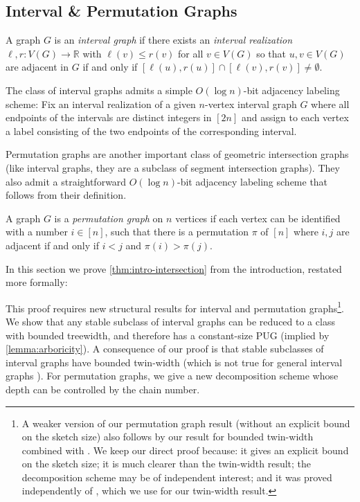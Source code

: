 \documentclass{theoretics}
\makeatletter
\newcommand{\cF}{\ensuremath{\mathcal{F}}}
\newcommand{\bR}{\ensuremath{\mathbb{R}}}
\newcommand\IfRestateTF{%
  \ifx\label\thmt@gobble@label %
    \expandafter\@firstoftwo
  \else
    \expandafter\@secondoftwo
  \fi
}
\newcommand{\RestateRemark}{\IfRestateTF{{\normalfont\bfseries (Restated) }}{}}
\makeatother
\begin{document}
\subsection{Interval \& Permutation Graphs}
\label{section:intersection graphs}

\begin{definition}
A graph $G$ is an \emph{interval graph} if there
exists an \emph{interval realization} $\ell, r : V(G) \to \bR$ with $\ell(v) \le r(v)$ for all $v\in
V(G)$ so that $u,v\in V(G)$ are adjacent in $G$ if and only if $[\ell(u),r(u)]\cap[\ell(v),r(v)] \ne
\emptyset$.
\end{definition}

The class of interval graphs admits a simple $O(\log n)$-bit adjacency labeling scheme: Fix an
interval realization of a given $n$-vertex interval graph $G$ where all endpoints of the intervals
are distinct integers in $[2n]$ and assign to each vertex a label consisting of the two endpoints of
the corresponding interval.

Permutation graphs are another important class of geometric intersection graphs (like interval
graphs, they are a subclass of segment intersection graphs). They also admit a straightforward
$O(\log n)$-bit adjacency labeling scheme that follows from their definition.

\begin{definition}
	A graph $G$ is a \emph{permutation graph} on $n$ vertices if each vertex can be identified with a
	number $i \in [n]$, such that there is a permutation $\pi$ of $[n]$ where $i,j$ are adjacent if and
	only if $i < j$ and $\pi(i) > \pi(j)$.
\end{definition}

In this section we prove \cref{thm:intro-intersection} from the introduction, restated more formally:

This proof requires new structural results for interval and permutation graphs\footnote{A weaker
version of our permutation graph result (without an explicit bound on the sketch size)
also follows by our result for bounded twin-width combined with \cite{BKTW20}. We keep our
direct proof because: it gives an explicit bound on the sketch size; it is much clearer than the
twin-width result; the decomposition scheme may be of independent interest; and it was proved
independently of \cite{GPT21}, which we use for our twin-width result.}. We show that any stable
subclass of interval graphs can be reduced to a class with bounded treewidth, and therefore has a
constant-size PUG (implied by \cref{lemma:arboricity}).  A consequence of our proof is that stable
subclasses of interval graphs have bounded twin-width (which is not true for general interval
graphs \cite{BKTW20}).  For permutation graphs, we give a new decomposition scheme whose depth can
be controlled by the chain number.
\end{document}
